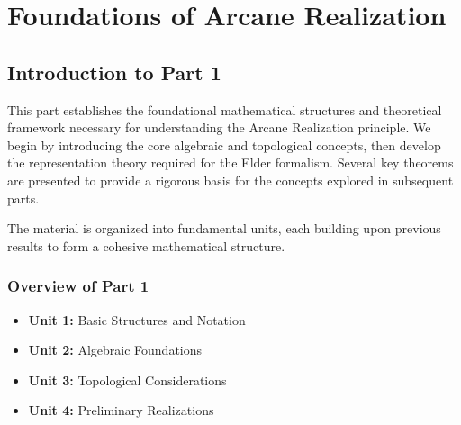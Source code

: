 
\part{Foundations of Arcane Realization}


\chapter*{Introduction to Part 1}

This part establishes the foundational mathematical structures and theoretical framework necessary for understanding the Arcane Realization principle. We begin by introducing the core algebraic and topological concepts, then develop the representation theory required for the Elder formalism. Several key theorems are presented to provide a rigorous basis for the concepts explored in subsequent parts.

The material is organized into fundamental units, each building upon previous results to form a cohesive mathematical structure.

\section*{Overview of Part 1}
\begin{itemize}
    \item \textbf{Unit 1:} Basic Structures and Notation
    \item \textbf{Unit 2:} Algebraic Foundations
    \item \textbf{Unit 3:} Topological Considerations
    \item \textbf{Unit 4:} Preliminary Realizations
\end{itemize}







